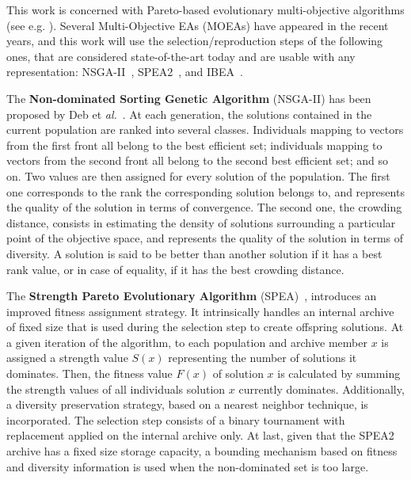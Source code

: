 \documentclass{llncs}
\begin{document}
This work is concerned with Pareto-based evolutionary multi-objective algorithms (see e.g. \cite{Deb-book}). Several Multi-Objective EAs (MOEAs) have appeared in the recent years, and this work will use the selection/reproduction steps of the following ones, that are considered state-of-the-art today and  are usable with any representation: NSGA-II~\cite{Deb2002}, SPEA2~\cite{Zitzler2001}, and IBEA~\cite{Zitzler2004}.


The {\bf Non-dominated Sorting Genetic Algorithm} (NSGA-II) has been proposed by Deb et \textit{al.}~\cite{Deb2002}. %
At each generation,  the solutions contained in the current  population are ranked into several classes. 
Individuals mapping to vectors from the first front all belong to
the best efficient set; individuals mapping to vectors from the second front all belong to the second best efficient set; and so on.
Two values are then assigned for every solution of the population. The first one corresponds to the rank  the corresponding solution
belongs to, and represents the quality of the solution in terms of convergence. The second one, the crowding distance, consists in
estimating the density of solutions surrounding a particular point of the objective space, and represents the quality of the solution in
terms of diversity.  A solution is said to be better than another solution if it has a best rank value, or in case of equality, if it has
the best crowding distance.

The {\bf Strength Pareto Evolutionary Algorithm} (SPEA)~\cite{Zitzler2001}, introduces an improved fitness assignment strategy. It intrinsically handles an internal archive of fixed size that is used during the selection step to create offspring solutions. At a given iteration of the algorithm, to each population and archive member $x$ is assigned a strength value $S(x)$ representing the number
of solutions it dominates. Then, the fitness value $F (x)$ of solution $x$ is calculated by summing the strength values of all individuals solution $x$ currently dominates. Additionally,
a diversity preservation strategy, based on a nearest neighbor technique, is incorporated.
The selection step consists of a binary tournament with replacement applied on the internal archive only.
At last, given that the SPEA2 archive has a fixed size storage capacity, a bounding mechanism based on fitness and diversity information is used when the non-dominated set is too large. 
\end{document}
